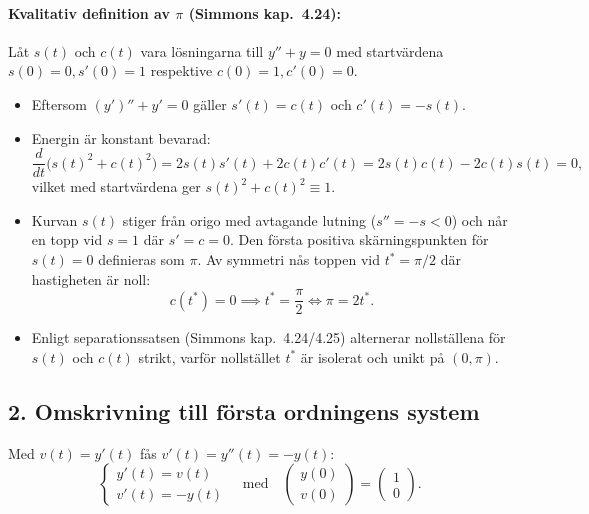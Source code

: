 \documentclass{article}
\begin{document}
\paragraph{Kvalitativ definition av $\pi$ (Simmons kap.~4.24):}
Låt $s(t)$ och $c(t)$ vara lösningarna till $y'' + y = 0$ med startvärdena $s(0) = 0, s'(0) = 1$ respektive $c(0) = 1, c'(0) = 0$.
\begin{itemize}
    \item Eftersom $(y')'' + y' = 0$ gäller $s'(t) = c(t)$ och $c'(t) = -s(t)$.
    \item Energin är konstant bevarad:
    \begin{equation}
        \frac{d}{dt}\big(s(t)^2 + c(t)^2\big) = 2s(t)s'(t) + 2c(t)c'(t) = 2s(t)c(t) - 2c(t)s(t) = 0,
    \end{equation}
    vilket med startvärdena ger $s(t)^2 + c(t)^2 \equiv 1$.
    \item Kurvan $s(t)$ stiger från origo med avtagande lutning ($s'' = -s < 0$) och når en topp vid $s = 1$ där $s' = c = 0$. Den första positiva skärningspunkten för $s(t) = 0$ definieras som $\pi$. Av symmetri nås toppen vid $t^* = \pi/2$ där hastigheten är noll:
    \begin{equation}
        c(t^*) = 0 \implies t^* = \frac{\pi}{2} \iff \pi = 2t^*.
    \end{equation}
    \item Enligt separationssatsen (Simmons kap.~4.24/4.25) alternerar nollställena för $s(t)$ och $c(t)$ strikt, varför nollstället $t^*$ är isolerat och unikt på $(0, \pi)$.
\end{itemize}

\subsection*{2. Omskrivning till första ordningens system}
Med $v(t) = y'(t)$ fås $v'(t) = y''(t) = -y(t)$:
\begin{equation}
    \begin{cases}
        y'(t) = v(t) \\
        v'(t) = -y(t)
    \end{cases}
    \quad \text{med} \quad
    \begin{pmatrix} y(0) \\ v(0) \end{pmatrix} = \begin{pmatrix} 1 \\ 0 \end{pmatrix}.
\end{equation}
\end{document}

